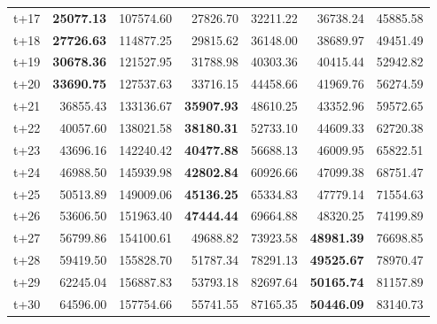 \begin{table}[H]
\begin{tabular}{lrrrrrr}
t+17  & \textbf{25077.13}  & 107574.60  & 27826.70  & 32211.22  & 36738.24  & 45885.58  \\
t+18  & \textbf{27726.63}  & 114877.25  & 29815.62  & 36148.00  & 38689.97  & 49451.49  \\
t+19  & \textbf{30678.36}  & 121527.95  & 31788.98  & 40303.36  & 40415.44  & 52942.82  \\
t+20  & \textbf{33690.75}  & 127537.63  & 33716.15  & 44458.66  & 41969.76  & 56274.59  \\
t+21  & 36855.43  & 133136.67  & \textbf{35907.93}  & 48610.25  & 43352.96  & 59572.65  \\
t+22  & 40057.60  & 138021.58  & \textbf{38180.31}  & 52733.10  & 44609.33  & 62720.38  \\
t+23  & 43696.16  & 142240.42  & \textbf{40477.88}  & 56688.13  & 46009.95  & 65822.51  \\
t+24  & 46988.50  & 145939.98  & \textbf{42802.84}  & 60926.66  & 47099.38  & 68751.47  \\
t+25  & 50513.89  & 149009.06  & \textbf{45136.25}  & 65334.83  & 47779.14  & 71554.63  \\
t+26  & 53606.50  & 151963.40  & \textbf{47444.44}  & 69664.88  & 48320.25  & 74199.89  \\
t+27  & 56799.86  & 154100.61  & 49688.82  & 73923.58  & \textbf{48981.39}  & 76698.85  \\
t+28  & 59419.50  & 155828.70  & 51787.34  & 78291.13  & \textbf{49525.67}  & 78970.47  \\
t+29  & 62245.04  & 156887.83  & 53793.18  & 82697.64  & \textbf{50165.74}  & 81157.89  \\
t+30  & 64596.00  & 157754.66  & 55741.55  & 87165.35  & \textbf{50446.09}  & 83140.73  \\

\bottomrule
\end{tabular}
\end{table}
